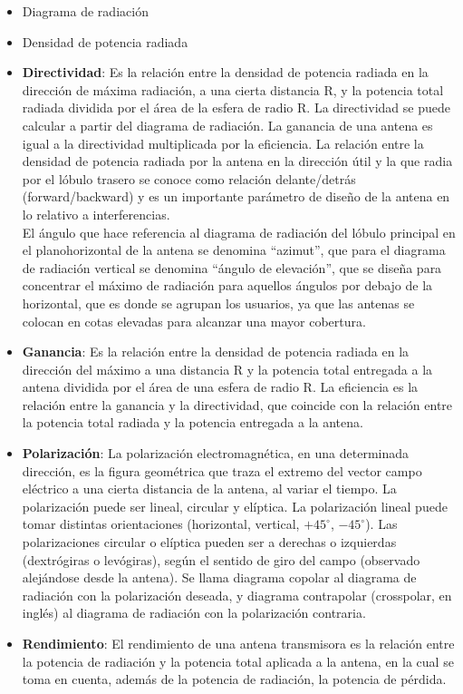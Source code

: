 \documentclass[
	12pt, %
	fleqn, %
	a4paper, %
	oneside, %
]{LegrandOrangeBook}
\begin{document}
\begin{itemize}
\item Diagrama de radiación
\item Densidad de potencia radiada
\item \textbf{Directividad}: Es la relación entre la densidad de potencia radiada en la dirección de máxima radiación, a una cierta distancia R, y la potencia total radiada dividida por el área de la esfera de radio R. La directividad se puede calcular a partir del diagrama de radiación. La ganancia de una antena es igual a la directividad multiplicada por la eficiencia. La relación entre la densidad de potencia radiada por la antena en la dirección útil y la que radia por el lóbulo trasero se conoce como relación delante/detrás (forward/backward) y es un importante parámetro de diseño de la antena en lo relativo a interferencias.\\
El ángulo que hace referencia al diagrama de radiación del lóbulo principal en el planohorizontal de la antena se denomina ``azimut'', que para el diagrama de radiación vertical se denomina ``ángulo de elevación'', que se diseña para concentrar el máximo de radiación para aquellos ángulos por debajo de la horizontal, que es donde se agrupan los usuarios, ya que las antenas se colocan en cotas elevadas para alcanzar una mayor cobertura.
\item \textbf{Ganancia}: Es la relación entre la densidad de potencia radiada en la dirección del máximo a una distancia R y la potencia total entregada a la antena dividida por el área de una esfera de radio R. La eficiencia es la relación entre la ganancia y la directividad, que coincide con la relación entre la potencia total radiada y la potencia entregada a la antena.
\item \textbf{Polarización}: La polarización electromagnética, en una determinada dirección, es la figura geométrica que traza el extremo del vector campo eléctrico a una cierta distancia de la antena, al variar el tiempo. La polarización puede ser lineal, circular y elíptica. La polarización lineal puede tomar distintas orientaciones (horizontal, vertical, $+45^\circ$, $-45^\circ$). Las polarizaciones circular o elíptica pueden ser a derechas o izquierdas (dextrógiras o levógiras), según el sentido de giro del campo (observado alejándose desde la antena). Se llama diagrama copolar al diagrama de radiación con la polarización deseada, y diagrama contrapolar (crosspolar, en inglés) al diagrama de radiación con la polarización contraria.
\item \textbf{Rendimiento}: El rendimiento de una antena transmisora es la relación entre la potencia de radiación y la potencia total aplicada a la antena, en la cual se toma en cuenta, además de la potencia de radiación, la potencia de pérdida.

\end{itemize}
\end{document}

